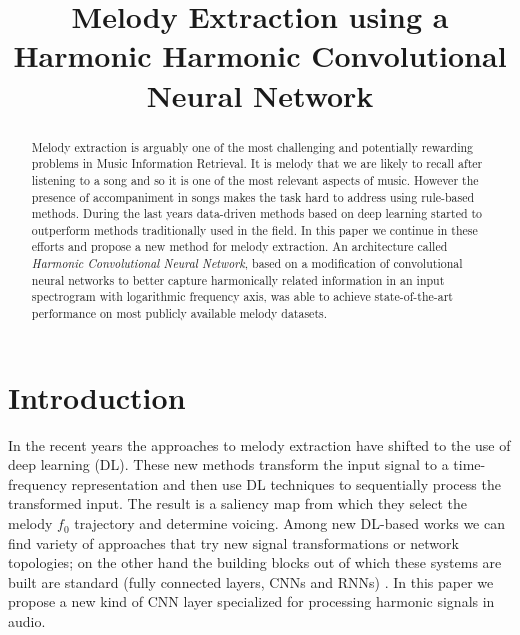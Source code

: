 \documentclass{article}
\title{Melody Extraction using a Harmonic Harmonic Convolutional Neural Network}
\begin{document}
%
\maketitle
%
\begin{abstract}
Melody extraction is arguably one of the most challenging and potentially rewarding problems in Music Information Retrieval. It is melody that we are likely to recall after listening to a song and so it is one of the most relevant aspects of music. However the presence of accompaniment in songs makes the task hard to address using rule-based methods. During the last years data-driven methods based on deep learning started to outperform methods traditionally used in the field. In this paper we continue in these efforts and propose a new method for melody extraction. An architecture called \emph{Harmonic Convolutional Neural Network}, based on a modification of convolutional neural networks to better capture harmonically related information in an input spectrogram with logarithmic frequency axis, was able to achieve state-of-the-art performance on most publicly available melody datasets.
\end{abstract}
%
\section{Introduction}\label{sec:introduction}


In the recent years the approaches to melody extraction have shifted to the use of deep learning (DL). These new methods transform the input signal to a time-frequency representation and then use DL techniques to sequentially process the transformed input. The result is a saliency map from which they select the melody $f_0$ trajectory and determine voicing. Among new DL-based works we can find variety of approaches that try new signal transformations or network topologies; on the other hand the building blocks out of which these systems are built are standard (fully connected layers, CNNs and RNNs) \cite{Kum2016,Rigaud2016,Bittner2017,DBasaranSEssid2018}. In this paper we propose a new kind of CNN layer specialized for processing harmonic signals in audio.
\end{document}
